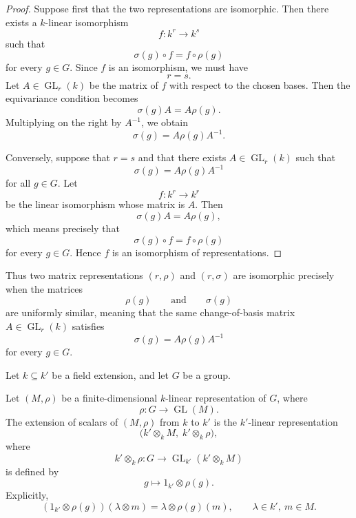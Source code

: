 \begin{proof}
    Suppose first that the two representations are isomorphic. Then there exists
    a \(k\)-linear isomorphism
    \[
        f:k^r\longrightarrow k^s
    \]
    such that
    \[
        \sigma(g)\circ f=f\circ \rho(g)
    \]
    for every \(g\in G\). Since \(f\) is an isomorphism, we must have
    \[
        r=s.
    \]
    Let \(A\in \operatorname{GL}_r(k)\) be the matrix of \(f\) with respect to the
    chosen bases. Then the equivariance condition becomes
    \[
        \sigma(g)A=A\rho(g).
    \]
    Multiplying on the right by \(A^{-1}\), we obtain
    \[
        \sigma(g)=A\rho(g)A^{-1}.
    \]

    Conversely, suppose that \(r=s\) and that there exists
    \(A\in \operatorname{GL}_r(k)\) such that
    \[
        \sigma(g)=A\rho(g)A^{-1}
    \]
    for all \(g\in G\). Let
    \[
        f:k^r\longrightarrow k^r
    \]
    be the linear isomorphism whose matrix is \(A\). Then
    \[
        \sigma(g)A=A\rho(g),
    \]
    which means precisely that
    \[
        \sigma(g)\circ f=f\circ \rho(g)
    \]
    for every \(g\in G\). Hence \(f\) is an isomorphism of representations.
\end{proof}

\begin{remark}
    Thus two matrix representations \((r,\rho)\) and \((r,\sigma)\) are
    isomorphic precisely when the matrices
    \[
        \rho(g)
        \qquad\text{and}\qquad
        \sigma(g)
    \]
    are uniformly similar, meaning that the same change-of-basis matrix
    \(A\in \operatorname{GL}_r(k)\) satisfies
    \[
        \sigma(g)=A\rho(g)A^{-1}
    \]
    for every \(g\in G\).
\end{remark}

Let \(k\subseteq k'\) be a field extension, and let \(G\) be a group.

\begin{definition}
    Let \((M,\rho)\) be a finite-dimensional \(k\)-linear representation of \(G\),
    where
    \[
        \rho:G\longrightarrow \operatorname{GL}(M).
    \]
    The extension of scalars of \((M,\rho)\) from \(k\) to \(k'\) is the
    \(k'\)-linear representation
    \[
        \bigl(k'\otimes_k M,\; k'\otimes_k \rho\bigr),
    \]
    where
    \[
        k'\otimes_k \rho:G\longrightarrow
        \operatorname{GL}_{k'}(k'\otimes_k M)
    \]
    is defined by
    \[
        g\longmapsto 1_{k'}\otimes \rho(g).
    \]
    Explicitly,
    \[
        (1_{k'}\otimes \rho(g))(\lambda\otimes m)
        =
        \lambda\otimes \rho(g)(m),
        \qquad
        \lambda\in k',\ m\in M.
    \]
\end{definition}

